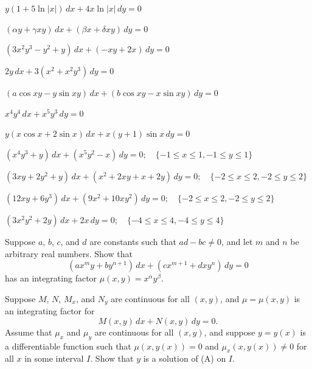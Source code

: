 \begin{exerciselist}

\item\label{exer:2.6.17}$y(1+5\ln|x|)\,dx+4x\ln|x|\,dy=0$

 \item\label{exer:2.6.18}$(\alpha y+ \gamma xy)\,dx+(\beta x+ \delta xy)\,dy=0$

\item\label{exer:2.6.19}$(3x^2y^3-y^2+y)\,dx+(-xy+2x)\,dy=0$

\item\label{exer:2.6.20}$2y\,dx+ 3(x^2+x^2y^3)\,dy=0$

\item\label{exer:2.6.21}$(a\cos xy-y\sin xy)\,dx+(b\cos xy-x\sin xy)\,
dy=0$

\item\label{exer:2.6.22}$x^4y^4\,dx+x^5y^3\,dy=0$

\item\label{exer:2.6.23}$y(x\cos x+2\sin x)\,dx+x(y+1)\sin x\,dy=0$



\item\label{exer:2.6.24}\CGex
 $(x^4y^3+y)\,dx+(x^5y^2-x)\,dy=0;   \quad \{-1\le x\le1,-1\le y\le1\}$


\item\label{exer:2.6.25}\CGex
$(3xy+2y^2+y)\,dx+(x^2+2xy+x+2y)\,dy=0;   \quad \{-2\le x\le2,-2\le
y\le2\}$


\item\label{exer:2.6.26}\CGex
$(12 xy+6y^3)\,dx+(9x^2+10xy^2)\,dy=0;   \quad \{-2\le x\le2,-2\le y\le2\}$

\item\label{exer:2.6.27}\CGex
$(3x^2y^2+2y)\,dx+ 2x\,dy=0;   \quad \{-4\le x\le4,-4\le y\le4\}$




\item\label{exer:2.6.28}Suppose $a$, $b$, $c$, and $d$ are constants such that
$ad-bc\ne0$, and let $m$ and $n$ be arbitrary real numbers.
Show that
\[
(ax^my+by^{n+1})\,dx+(cx^{m+1}+dxy^n)\,dy=0
\]
has an integrating factor $\mu(x,y)=x^\alpha y^\beta$.

\item\label{exer:2.6.29}Suppose $M$, $N$, $M_x$, and $N_y$  are continuous for all
$(x,y)$, and $\mu=\mu(x,y)$  is an integrating factor for
\[
M(x,y)\,dx+N(x,y)\,dy=0.\tag{A}
\]
Assume that $\mu_x$ and $\mu_y$ are continuous for all $(x,y)$, and
suppose   $y=y(x)$ is a differentiable function such that
$\mu(x,y(x))=0$ and $\mu_x(x,y(x))\ne0$ for all $x$ in some interval
$I$. Show that $y$ is a solution of (A) on $I$.


\end{exerciselist}
